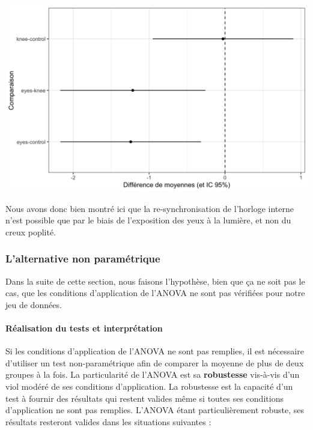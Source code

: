 \documentclass[
  a4paper,
]{article}
\begin{document}
\begin{center}\includegraphics[width=0.9\linewidth]{figure/unnamed-chunk-90-1} \end{center}

Nous avons donc bien montré ici que la re-synchronisation de l'horloge interne n'est possible que par le biais de l'exposition des yeux à la lumière, et non du creux poplité.

\hypertarget{lalternative-non-paramuxe9trique-3}{%
\subsubsection{L'alternative non paramétrique}\label{lalternative-non-paramuxe9trique-3}}

Dans la suite de cette section, nous faisons l'hypothèse, bien que ça ne soit pas le cas, que les conditions d'application de l'ANOVA ne sont pas vérifiées pour notre jeu de données.

\hypertarget{ruxe9alisation-du-tests-et-interpruxe9tation}{%
\paragraph{Réalisation du tests et interprétation}\label{ruxe9alisation-du-tests-et-interpruxe9tation}}

Si les conditions d'application de l'ANOVA ne sont pas remplies, il est nécessaire d'utiliser un test non-paramétrique afin de comparer la moyenne de plus de deux groupes à la fois. La particularité de l'ANOVA est sa \textbf{robustesse} vis-à-vis d'un viol modéré de ses conditions d'application. La robustesse est la capacité d'un test à fournir des résultats qui restent valides même si toutes ses conditions d'application ne sont pas remplies. L'ANOVA étant particulièrement robuste, ses résultats resteront valides dans les situations suivantes :
\end{document}
